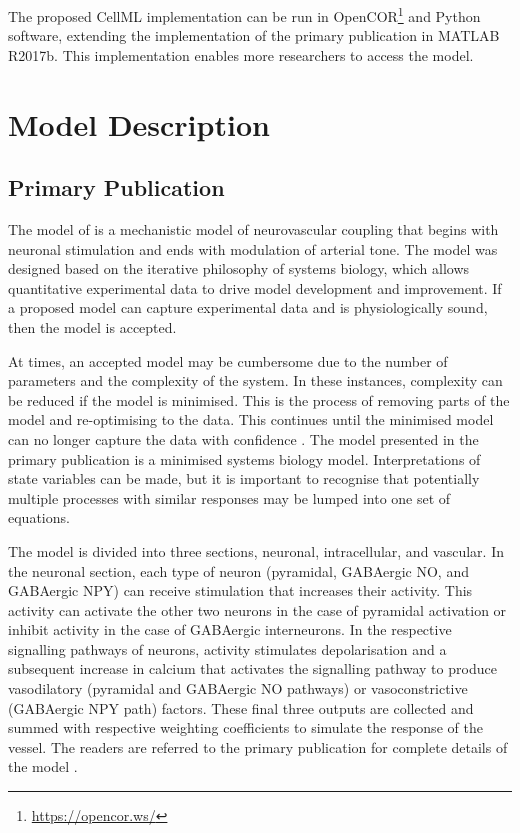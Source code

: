 \documentclass[fleqn,10pt]{physiome}
\begin{document}
The proposed CellML implementation can be run in OpenCOR\footnote{\url{https://opencor.ws/}} and Python software, extending the implementation of the primary publication in MATLAB R2017b. This implementation enables more researchers to access the model.


\section{Model Description}
\subsection{Primary Publication}

The model of \cite{Sten2020} is a mechanistic model of neurovascular coupling that begins with neuronal stimulation and ends with modulation of arterial tone. The model was designed based on the iterative philosophy of systems biology, which allows quantitative experimental data to drive model development and improvement. If a proposed model can capture experimental data and is physiologically sound, then the model is accepted.

At times, an accepted model may be cumbersome due to the number of parameters and the complexity of the system. In these instances, complexity can be reduced if the model is minimised. This is the process of removing parts of the model and re-optimising to the data. This continues until the minimised model can no longer capture the data with confidence \citep{Lundengard2016}. The model presented in the primary publication is a minimised systems biology model. Interpretations of state variables can be made, but it is important to recognise that potentially multiple processes with similar responses may be lumped into one set of equations.

The model is divided into three sections, neuronal, intracellular, and vascular. In the neuronal section, each type of neuron (pyramidal, GABAergic NO, and GABAergic NPY) can receive stimulation that increases their activity. This activity can activate the other two neurons in the case of pyramidal activation or inhibit activity in the case of GABAergic interneurons. In the respective signalling pathways of neurons, activity stimulates depolarisation and a subsequent increase in calcium that activates the signalling pathway to produce vasodilatory (pyramidal and GABAergic NO pathways) or vasoconstrictive (GABAergic NPY path) factors. These final three outputs are collected and summed with respective weighting coefficients to simulate the response of the vessel. The readers are referred to the primary publication for complete details of the model \citep{Sten2020}.
\end{document}

